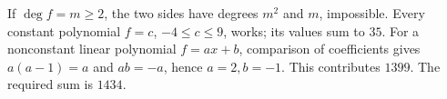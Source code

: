 If $\deg f=m\ge2$, the two sides have degrees $m^2$ and $m$, impossible. Every constant polynomial $f=c$, $-4\le c\le9$, works; its values sum to $35$. For a nonconstant linear polynomial $f=ax+b$, comparison of coefficients gives $a(a-1)=a$ and $ab=-a$, hence $a=2,b=-1$. This contributes $1399$. The required sum is $\boxed{1434}$.
